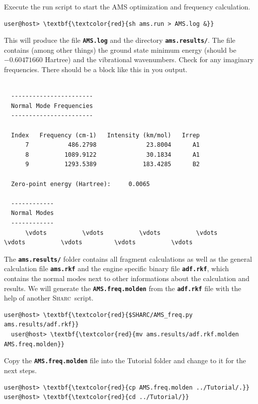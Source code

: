 \documentclass[a4paper,11pt,DIV=15,openany]{scrbook}
\newcommand{\sharc}{\textsc{Sharc}}
\newcommand{\ttt}[1]{\textbf{\texttt{#1}}}
\begin{document}
\normalsize

Execute the run script to start the \textsc{AMS} optimization and frequency calculation.
\begin{Verbatim}[commandchars=\\\{\}]
user@host> \textbf{\textcolor{red}{sh ams.run > AMS.log &}}
\end{Verbatim}
This will produce the file \ttt{AMS.log} and the directory \ttt{ams.results/}. 
The file contains (among other things) the ground state minimum energy (should be $-0.60471660$ Hartree) and the vibrational wavenumbers. 
Check for any imaginary frequencies.
There should be a block like this in you output.
\begin{oframed}
\footnotesize\begin{Verbatim}[commandchars=\\\{\}]

  -----------------------
  Normal Mode Frequencies
  -----------------------
 
  Index   Frequency (cm-1)   Intensity (km/mol)   Irrep
      7           486.2798              23.8004      A1
      8          1089.9122              30.1834      A1
      9          1293.5389             183.4285      B2
 
  Zero-point energy (Hartree):     0.0065
 
  ------------
  Normal Modes
  ------------
      \vdots          \vdots          \vdots          \vdots         \vdots          \vdots         \vdots          \vdots
\end{Verbatim}
\end{oframed}

\normalsize
The \ttt{ams.results/} folder contains all fragment calculations as well as the general calculation file \ttt{ams.rkf} and the engine specific binary file \ttt{adf.rkf}, which contains the normal modes next to other informations about the calculation and results. 
We will generate the \ttt{AMS.freq.molden} from the \ttt{adf.rkf} file with the help of another \sharc\ script.

\begin{Verbatim}[commandchars=\\\{\}]
  user@host> \textbf{\textcolor{red}{$SHARC/AMS_freq.py ams.results/adf.rkf}}
  user@host> \textbf{\textcolor{red}{mv ams.results/adf.rkf.molden AMS.freq.molden}}
\end{Verbatim}

Copy the \ttt{AMS.freq.molden} file into the Tutorial folder and change to it for the next steps.
\begin{Verbatim}[commandchars=\\\{\}]
user@host> \textbf{\textcolor{red}{cp AMS.freq.molden ../Tutorial/.}}
user@host> \textbf{\textcolor{red}{cd ../Tutorial/}}
\end{Verbatim}
\end{document}

